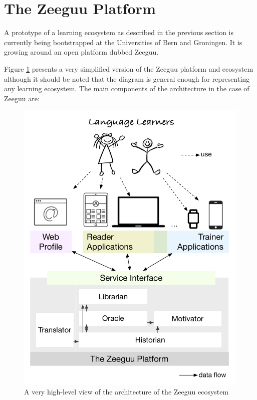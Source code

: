 

\section {The Zeeguu Platform}

A prototype of a learning ecosystem as described in the previous section is currently being bootstrapped at the Universities of Bern and Groningen. It is growing around an open platform dubbed Zeeguu. 

Figure \ref{fig:architecture} presents a very simplified version of the Zeeguu platform and ecosystem although it should be noted that the diagram is general enough for representing any learning ecosystem. The main components of the architecture in the case of Zeeguu are:

\begin{figure}[h!]
	\includegraphics[width=\linewidth]{images/zeeguu-architecture.pdf}
	\caption{A very high-level view of the architecture of the Zeeguu ecosystem}

	\label{fig:architecture}
\end{figure}


